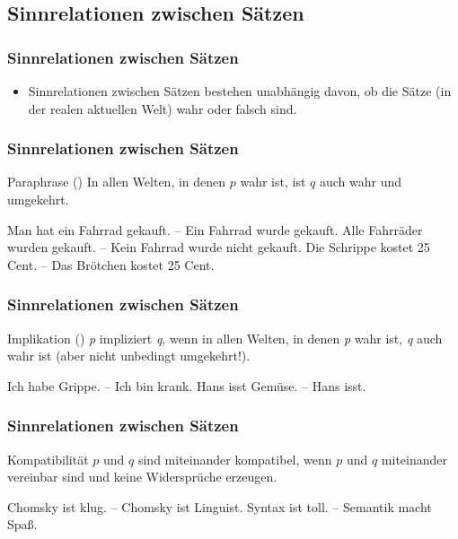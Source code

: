 \subsection{Sinnrelationen zwischen Sätzen}

\begin{frame}
\frametitle{Sinnrelationen zwischen Sätzen}

\begin{itemize}
	\item Sinnrelationen zwischen Sätzen bestehen unabhängig davon, ob die Sätze (in der realen aktuellen Welt) wahr oder falsch sind.
\end{itemize}

\end{frame}


\begin{frame}
\frametitle{Sinnrelationen zwischen Sätzen}

\begin{block}{Paraphrase ()}
In allen Welten, in denen $p$ wahr ist, ist $q$ auch wahr und umgekehrt.
\end{block}


	\ea Man hat ein Fahrrad gekauft. -- Ein Fahrrad wurde gekauft.
	\ex Alle Fahrräder wurden gekauft. -- Kein Fahrrad wurde nicht gekauft.
	\ex Die Schrippe kostet 25 Cent. -- Das Brötchen kostet 25 Cent.
	\z
		
\end{frame}


\begin{frame}
\frametitle{Sinnrelationen zwischen Sätzen}

\begin{block}{Implikation ()}
\textit{p} impliziert \textit{q}, wenn in allen Welten, in denen \textit{p} wahr ist, \textit{q} auch wahr ist (aber nicht unbedingt umgekehrt!).
\end{block}
		
\ea Ich habe Grippe. -- Ich bin krank.
\ex Hans isst Gemüse. -- Hans isst.
\z

\end{frame}


\begin{frame}
\frametitle{Sinnrelationen zwischen Sätzen}

\begin{block}{Kompatibilität}
$p$ und $q$ sind miteinander kompatibel, wenn $p$ und $q$ miteinander vereinbar sind und keine Widersprüche erzeugen.
\end{block}

	\ea Chomsky ist klug. -- Chomsky ist Linguist.
	\ex Syntax ist toll. -- Semantik macht Spa\ss{}.
	\z
		
\end{frame}


